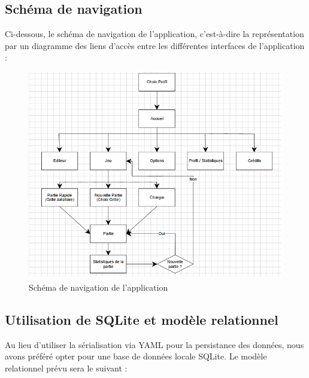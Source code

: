 \documentclass[a4paper, 12pt, twoside]{article}
\begin{document}
\newpage
\subsection{Schéma de navigation}

Ci-dessous, le schéma de navigation de l’application, c’est-à-dire la représentation par un diagramme des liens d’accès entre les différentes interfaces de l’application :

\bigbreak

\begin{figure}[H]
  \center
  \includegraphics[scale=0.8]{schema_navigation.png}
  \caption{Schéma de navigation de l'application}
  \label{schema_navig}
\end{figure}

\newpage
\subsection{Utilisation de SQLite et modèle relationnel}

Au lieu  d’utiliser la sérialisation via YAML pour la persistance des données, nous avons préféré opter pour une base de données locale SQLite. Le modèle relationnel prévu sera le suivant :

\bigbreak
\end{document}
